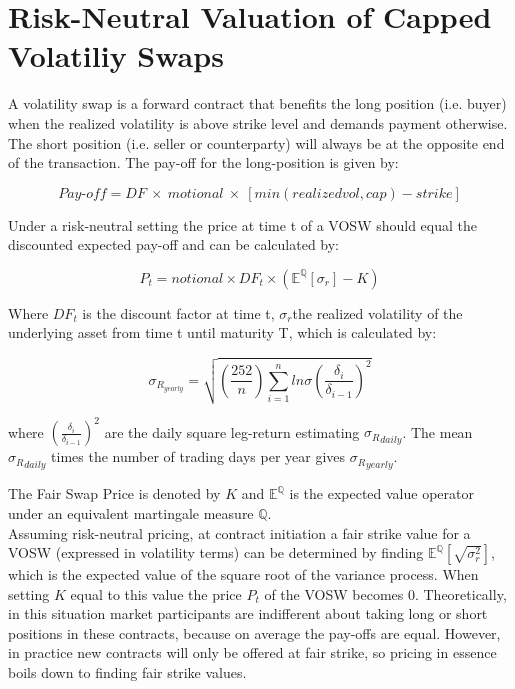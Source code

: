 \section{Risk-Neutral Valuation of Capped Volatiliy Swaps}

A volatility swap is a forward contract that benefits the long position (i.e. buyer) when the realized volatility is above strike level and demands payment otherwise. The short position (i.e. seller or counterparty) will always be at the opposite end of the transaction. The pay-off for the long-position is given by:

 \begin{equation}
    Pay\text{-}off = DF\ \times\ motional\ \times\ [min(realized vol, cap)- strike]
    \label{eq:pay-off}
\end{equation}

Under a risk-neutral setting the price at time t of a VOSW should equal the discounted expected pay-off and can be calculated by:

$$P_{t} = notional \times DF_{t} \times (\mathbb{E}^\mathbb{Q}[\sigma_{r}]-K)$$

Where $DF_{t}$ is the discount factor at time t, $\sigma_{r}$the realized volatility of the underlying asset from time t until maturity T, which is calculated by: 

 \begin{equation}
    \sigma_{R_{yearly}}=  \sqrt{\left(\frac{252}{n}\right) \sum_{i=1}^{n} ln \sigma \left(\frac{\delta_i}{\delta_{i-1}}\right)^2}  
    \label{eq:realize-voltaility}
\end{equation}


where $\left(\frac{\delta_i}{\delta_{i-1}}\right)^2$ are the daily square leg-return estimating ${\sigma_{R}}_{daily}$. The mean ${\sigma_{R}}_{daily}$ times the number of trading days per year gives ${\sigma_{R}}_{yearly}$.

The Fair Swap Price is denoted by $K$ and $\mathbb{E}^\mathbb{Q}$ is the expected value operator under an equivalent martingale measure $\mathbb{Q}$.\\
Assuming risk-neutral pricing, at contract initiation a fair strike value for a VOSW (expressed in volatility terms) can be determined by finding $\mathbb{E}^\mathbb{Q}[\sqrt{\sigma_{r}^{2}}]$, which is the expected value of the square root of the variance process. 
When setting $K$ equal to this value the price $P_{t}$ of the VOSW becomes 0. Theoretically, in this situation market participants are indifferent about taking long or short positions in these contracts, because on average the pay-offs are equal. However, in practice new contracts will only be offered at fair strike, so pricing in essence boils down to finding fair strike values.\\

